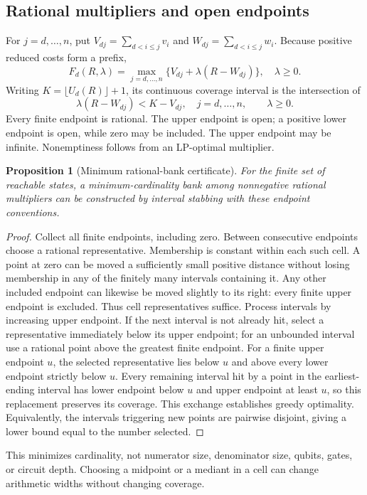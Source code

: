 \documentclass[referee,pdflatex,sn-mathphys-num]{sn-jnl}
\theoremstyle{thmstyleone}
\newtheorem{proposition}[theorem]{Proposition}
\theoremstyle{thmstyletwo}
\begin{document}
\subsection{Rational multipliers and open endpoints}
For $j=d,\ldots,n$, put $V_{dj}=\sum_{d<i\leq j}v_i$ and $W_{dj}=\sum_{d<i\leq j}w_i$. Because positive reduced costs form a prefix,
\begin{equation}\label{eq:affine}
 F_d(R,\lambda)=\max_{j=d,\ldots,n}\{V_{dj}+\lambda(R-W_{dj})\},\quad \lambda\geq0.
\end{equation}
Writing $K=\lfloor U_d(R)\rfloor+1$, its continuous coverage interval is the intersection of
\begin{equation}\label{eq:interval}
 \lambda(R-W_{dj})<K-V_{dj},\quad j=d,\ldots,n,\qquad \lambda\geq0.
\end{equation}
Every finite endpoint is rational. The upper endpoint is open; a positive lower endpoint is open, while zero may be included. The upper endpoint may be infinite. Nonemptiness follows from an LP-optimal multiplier.

\begin{proposition}[Minimum rational-bank certificate]\label{prop:continuous}
For the finite set of reachable states, a minimum-cardinality bank among nonnegative rational multipliers can be constructed by interval stabbing with these endpoint conventions.
\end{proposition}
\begin{proof}
Collect all finite endpoints, including zero. Between consecutive endpoints choose a rational representative. Membership is constant within each such cell. A point at zero can be moved a sufficiently small positive distance without losing membership in any of the finitely many intervals containing it. Any other included endpoint can likewise be moved slightly to its right: every finite upper endpoint is excluded. Thus cell representatives suffice. Process intervals by increasing upper endpoint. If the next interval is not already hit, select a representative immediately below its upper endpoint; for an unbounded interval use a rational point above the greatest finite endpoint. For a finite upper endpoint $u$, the selected representative lies below $u$ and above every lower endpoint strictly below $u$. Every remaining interval hit by a point in the earliest-ending interval has lower endpoint below $u$ and upper endpoint at least $u$, so this replacement preserves its coverage. This exchange establishes greedy optimality. Equivalently, the intervals triggering new points are pairwise disjoint, giving a lower bound equal to the number selected.
\end{proof}
This minimizes cardinality, not numerator size, denominator size, qubits, gates, or circuit depth. Choosing a midpoint or a mediant in a cell can change arithmetic widths without changing coverage.
\end{document}
